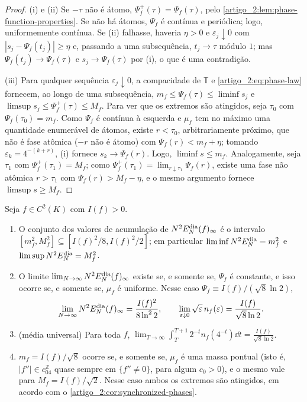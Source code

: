 \begin{proof}
(i) e (ii) Se $-\tau$ não é átomo, $\Psi_f^+(\tau)=\Psi_f(\tau)$, pelo
\cref{artigo_2:lem:phase-function-properties}. Se não há átomos, $\Psi_f$ é contínua e
periódica; logo, uniformemente contínua. Se (ii) falhasse, haveria $\eta>0$ e
$\varepsilon_j\downarrow0$ com $|s_j-\Psi_f(t_j)|\ge\eta$ e, passando a uma
subsequência, $t_j\to\tau$ módulo $1$; mas $\Psi_f(t_j)\to\Psi_f(\tau)$ e $s_j\to\Psi_f(\tau)$
por (i), o que é uma contradição.

(iii) Para qualquer sequência $\varepsilon_j\downarrow0$, a compacidade de
$\mathbb T$ e \eqref{artigo_2:eq:phase-law} fornecem, ao longo de uma subsequência,
$m_f\le\Psi_f(\tau)\le\liminf s_j$ e $\limsup s_j\le\Psi_f^+(\tau)\le M_f$.
Para ver que os extremos são atingidos, seja $\tau_0$ com $\Psi_f(\tau_0)=m_f$.
Como $\Psi_f$ é contínua à esquerda e $\mu_f$ tem no máximo uma quantidade
enumerável de átomos, existe $r<\tau_0$, arbitrariamente próximo, que não é
fase atômica ($-r$ não é átomo) com $\Psi_f(r)<m_f+\eta$; tomando
$\varepsilon_k=4^{-(k+r)}$, (i) fornece $s_k\to\Psi_f(r)$. Logo,
$\liminf s\le m_f$. Analogamente, seja $\tau_1$ com $\Psi_f^+(\tau_1)=M_f$; como
$\Psi_f^+(\tau_1)=\lim_{r\downarrow\tau_1}\Psi_f(r)$, existe uma fase não
atômica $r>\tau_1$ com $\Psi_f(r)>M_f-\eta$, e o mesmo argumento fornece
$\limsup s\ge M_f$.
\end{proof}

\begin{corollary}\label{map:artigo_2:12.8}
\label{artigo_2:cor:phase-accumulation}
Seja $f\in C^2(K)$ com $I(f)>0$.
\begin{enumerate}[label=(\alph*)]
\item O conjunto dos valores de acumulação de $N^2E_N^{\rm dia}(f)_\infty$ é o
 intervalo $[m_f^2,M_f^2]\subseteq[I(f)^2/8,I(f)^2/2]$; em particular
 $\liminf N^2E_N^{\rm dia}=m_f^2$ e $\limsup N^2E_N^{\rm dia}=M_f^2$.
\item O limite $\lim_{N\to\infty}N^2E_N^{\rm dia}(f)_\infty$ existe se, e somente
 se, $\Psi_f$ é constante, e isso ocorre se, e somente se, $\mu_f$ é uniforme.
 Nesse caso $\Psi_f\equiv I(f)/(\sqrt8\ln2)$,
 \[
  \lim_{N\to\infty}N^2E_N^{\rm dia}(f)_\infty=\frac{I(f)^2}{8\ln^22},
  \qquad
  \lim_{\varepsilon\downarrow0}\sqrt\varepsilon\,n_f(\varepsilon)=\frac{I(f)}{\sqrt8\ln2}.
 \]
\item (média universal) Para toda $f$,
 $\displaystyle\lim_{T\to\infty}\int_T^{T+1}2^{-t}n_f(4^{-t})\dd t=\frac{I(f)}{\sqrt8\ln2}$.
\item $m_f=I(f)/\sqrt8$ ocorre se, e somente se, $\mu_f$ é uma massa pontual
 (isto é, $|f''|\in c_04^{\mathbb Z}$ quase sempre em $\{f''\ne0\}$, para
 algum $c_0>0$), e o mesmo vale para $M_f=I(f)/\sqrt2$. Nesse caso ambos os
 extremos são atingidos, em acordo com o \cref{artigo_2:cor:synchronized-phases}.
\end{enumerate}
\end{corollary}

